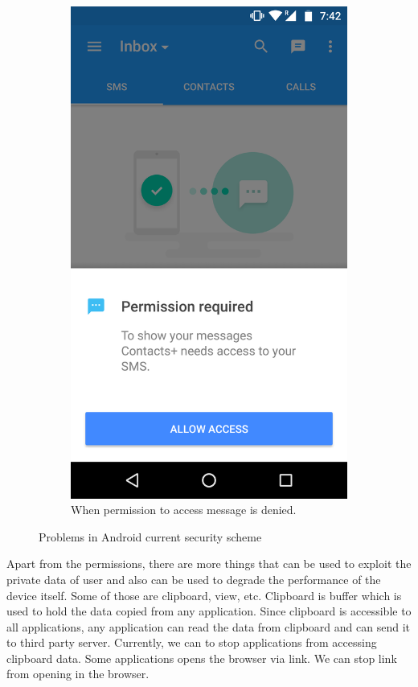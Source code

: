 \begin{figure}[h]
\begin{subfigure}[h]{0.45\textwidth}
		\includegraphics[width=\textwidth]{restrict_prob2.png}
		\caption{When permission to access message is denied.}
	\end{subfigure}
	\caption{Problems in Android current security scheme}
	\label{fig:prob1}
\end{figure}

Apart from the permissions, there are more things that can be used to exploit the private data of user and also can be used to degrade the performance of the device itself. Some of those are clipboard, view, etc. Clipboard is buffer which is used to hold the data copied from any application. Since clipboard is accessible to all applications, any application can read the data from clipboard and can send it to third party server. Currently, we can to stop applications from accessing clipboard data. Some applications opens the browser via link. We can stop link from opening in the browser.

